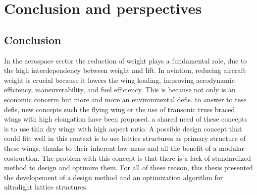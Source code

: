 \chapter*{Conclusion and perspectives}
{}
%

\section*{Conclusion}
In the aerospace sector the reduction of weight plays a fundamental role, due to the high interdependency between weight and lift. In aviation, reducing aircraft weight is crucial because it lowers the wing loading, improving aerodynamic efficiency, maneuverability, and fuel efficiency. This is because not only is an economic concerm but more and more an environmental defis. to answer to tese defis, new concepts such the flying wing or the use of transonic truss braced wings with high elongation have been proposed. a shared need of these concepts is to use thin dry wings with high aspect ratio. A possible design concept that could fitt well in this context is to use lattice structures as primary structure of these wings, thanks to their inherent low mass and all the benefit of a modular costruction. The problem with this concept is that there is a lack of standardized method to design and optimize them. For all of these reason, this thesis presented the developement of a design method and an optimization algorithm for ultralight lattice structures. 


